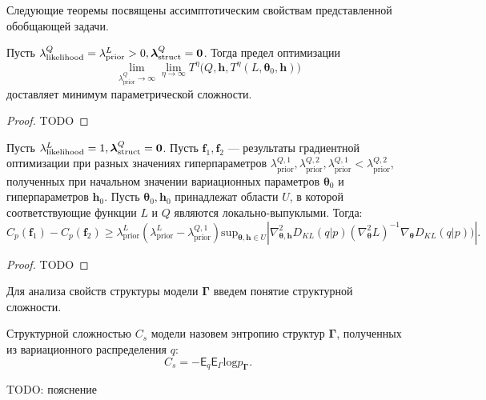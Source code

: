 Следующие теоремы посвящены ассимптотическим свойствам представленной обобщающей задачи.
\begin{theorem}
Пусть ${\lambda_{\text{likelihood}}^Q}= {\lambda_{\text{prior}}^L}>0, {\boldsymbol{\lambda}^Q_{\text{struct}} }= \bf{0}$.
Тогда предел оптимизации
\[
\lim_{{\lambda^Q_\text{prior}} \to \infty} \lim_{\eta \to \infty}   T^\eta\bigl(Q, \mathbf{h}, T^\eta(L, \boldsymbol{\theta}_0, \mathbf{h})\bigr)
\]  
доставляет минимум параметрической сложности. 
\end{theorem}
\begin{proof}
TODO
\end{proof}

\begin{theorem}
Пусть ${\lambda^L_{\text{likelihood}}} = 1 ,{\boldsymbol{\lambda}^Q_{\text{struct}}} = \bf 0$.
Пусть  $\mathbf{f}_1, \mathbf{f}_2$ --- результаты градиентной оптимизации при разных значениях гиперпараметров ${\lambda_{\text{prior}}^{Q,1},\lambda_{\text{prior}}^{Q,2}, \lambda_{\text{prior}}^{Q,1}<\lambda_{\text{prior}}^{Q,2}}$, полученных при начальном значении вариационных параметров $\boldsymbol{\theta}_0$ и гиперпараметров $\mathbf{h}_0$.
Пусть $\boldsymbol{\theta}_0, \mathbf{h}_0$ принадлежат области  $U$, в которой соответствующие функции $L$ и $Q$ являются локально-выпуклыми.
Тогда:
\[
    C_p(\mathbf{f}_1)-C_p(\mathbf{f}_2)  \geq {\lambda_\text{prior}^L(\lambda_\text{prior}^L-\lambda_\text{prior}^{Q,1})}\text{sup}_{\boldsymbol{\theta}, \mathbf{h} \in U}|\nabla^2_{\boldsymbol{\theta}, \mathbf{h}} {D_{KL}(q|p)} (\nabla^2_{\boldsymbol{\theta}} L)^{-1}   \nabla_{\boldsymbol{\theta}} {D_{KL}(q|p))}|.
\]
\end{theorem}
\begin{proof}
TODO
\end{proof}

Для анализа свойств структуры модели $\boldsymbol{\Gamma}$ введем понятие структурной сложности.
\begin{defin}
Структурной сложностью $C_s$ модели назовем энтропию структур $\boldsymbol{\Gamma}$, полученных из вариационного распределения $q$:
\[
    C_s = -\mathsf{E}_q \mathsf{E}_\Gamma \text{log} p_{\boldsymbol{\Gamma}}.
\]
\end{defin}
TODO: пояснение

